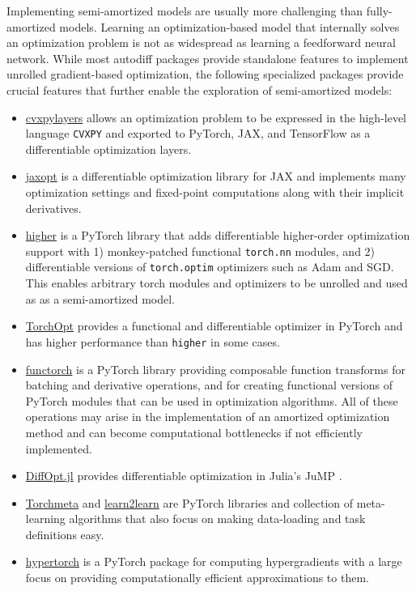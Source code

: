 Implementing semi-amortized models are usually more challenging
than fully-amortized models. Learning an optimization-based
model that internally solves an optimization problem is
not as widespread as learning a feedforward neural network.
While most autodiff packages provide standalone features to implement
unrolled gradient-based optimization, the following specialized
packages provide crucial features that further enable the
exploration of semi-amortized models:
\begin{itemize}
\item \href{https://github.com/cvxgrp/cvxpylayers}{cvxpylayers}
  \citep{agrawal2019differentiable}
  allows an optimization problem to be expressed in the
  high-level language \verb!CVXPY! \citep{diamond2016cvxpy}
  and exported to PyTorch, JAX, and TensorFlow
  as a differentiable optimization layers.
\item \href{https://github.com/google/jaxopt}{jaxopt}
  \citep{blondel2021efficient}
  is a differentiable optimization library for JAX
  and implements many optimization settings and fixed-point
  computations along with their implicit derivatives.
\item \href{https://github.com/facebookresearch/higher}{higher}
  \citep{grefenstette2019generalized}
  is a PyTorch library that adds differentiable higher-order
  optimization support with
  1) monkey-patched functional \verb!torch.nn! modules,
  and 2) differentiable versions of \verb!torch.optim!
  optimizers such as Adam and SGD.
  This enables arbitrary torch modules and optimizers
  to be unrolled and used as as a semi-amortized model.
\item \href{https://github.com/metaopt/TorchOpt}{TorchOpt}
  provides a functional and differentiable optimizer in PyTorch
  and has higher performance than \verb!higher! in some cases.
\item \href{https://github.com/pytorch/functorch}{functorch}
  \citep{functorch2021} is a PyTorch library providing
  composable function transforms for batching and
  derivative operations, and for creating functional
  versions of PyTorch modules that can be used in
  optimization algorithms.
  All of these operations may arise in the implementation
  of an amortized optimization method and can become computational
  bottlenecks if not efficiently implemented.
\item \href{https://github.com/jump-dev/DiffOpt.jl}{DiffOpt.jl}
  provides differentiable optimization in Julia's JuMP
  \citep{DunningHuchetteLubin2017}.
\item \href{https://github.com/tristandeleu/pytorch-meta}{Torchmeta}
  \citep{deleu2019torchmeta} and
  \href{http://learn2learn.net}{learn2learn}
  \citep{arnold2020learn2learn}
  are PyTorch libraries and collection of meta-learning
  algorithms that also focus on making data-loading
  and task definitions easy.
\item \href{https://github.com/prolearner/hypertorch}{hypertorch}
  \citep{grazzi2020iteration}
  is a PyTorch package for computing hypergradients with a
  large focus on providing computationally efficient approximations
  to them.
\end{itemize}

